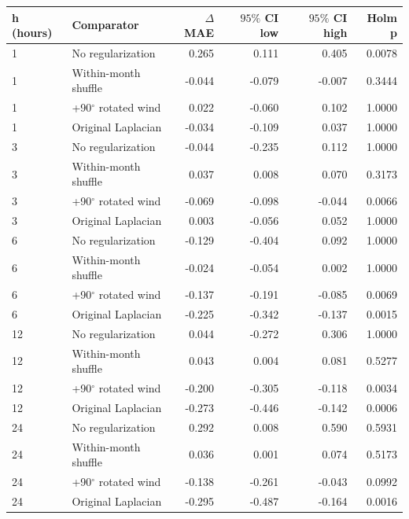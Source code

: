 \begin{tabular}{llrrrr}\hline
h (hours) & Comparator & $\Delta$MAE & $95\%$ CI low & $95\%$ CI high & Holm p \\
\hline
1 & No regularization & 0.265 & 0.111 & 0.405 & 0.0078 \\
1 & Within-month shuffle & -0.044 & -0.079 & -0.007 & 0.3444 \\
1 & +90$^\circ$ rotated wind & 0.022 & -0.060 & 0.102 & 1.0000 \\
1 & Original Laplacian & -0.034 & -0.109 & 0.037 & 1.0000 \\
3 & No regularization & -0.044 & -0.235 & 0.112 & 1.0000 \\
3 & Within-month shuffle & 0.037 & 0.008 & 0.070 & 0.3173 \\
3 & +90$^\circ$ rotated wind & -0.069 & -0.098 & -0.044 & 0.0066 \\
3 & Original Laplacian & 0.003 & -0.056 & 0.052 & 1.0000 \\
6 & No regularization & -0.129 & -0.404 & 0.092 & 1.0000 \\
6 & Within-month shuffle & -0.024 & -0.054 & 0.002 & 1.0000 \\
6 & +90$^\circ$ rotated wind & -0.137 & -0.191 & -0.085 & 0.0069 \\
6 & Original Laplacian & -0.225 & -0.342 & -0.137 & 0.0015 \\
12 & No regularization & 0.044 & -0.272 & 0.306 & 1.0000 \\
12 & Within-month shuffle & 0.043 & 0.004 & 0.081 & 0.5277 \\
12 & +90$^\circ$ rotated wind & -0.200 & -0.305 & -0.118 & 0.0034 \\
12 & Original Laplacian & -0.273 & -0.446 & -0.142 & 0.0006 \\
24 & No regularization & 0.292 & 0.008 & 0.590 & 0.5931 \\
24 & Within-month shuffle & 0.036 & 0.001 & 0.074 & 0.5173 \\
24 & +90$^\circ$ rotated wind & -0.138 & -0.261 & -0.043 & 0.0992 \\
24 & Original Laplacian & -0.295 & -0.487 & -0.164 & 0.0016 \\
\hline
\end{tabular}
